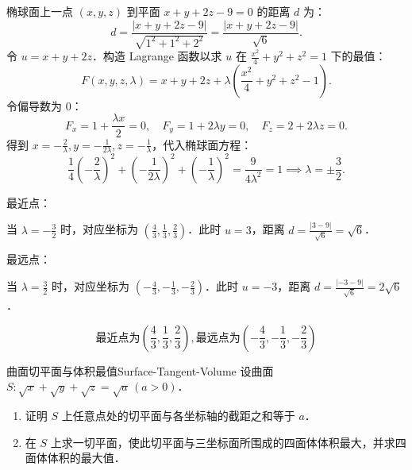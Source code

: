 \begin{solution}
    椭球面上一点 $(x, y, z)$ 到平面 $x + y + 2z - 9 = 0$ 的距离 $d$ 为：
    \begin{equation}
        d = \frac{|x + y + 2z - 9|}{\sqrt{1^2 + 1^2 + 2^2}} = \frac{|x + y + 2z - 9|}{\sqrt{6}}.
    \end{equation}
    令 $u = x + y + 2z$．构造 Lagrange 函数以求 $u$ 在 $\frac{x^2}{4} + y^2 + z^2 = 1$ 下的最值：
    \begin{equation}
        F(x, y, z, \lambda) = x + y + 2z + \lambda \left( \frac{x^2}{4} + y^2 + z^2 - 1 \right).
    \end{equation}
    令偏导数为 $0$：
    \begin{equation}
        F_x = 1 + \frac{\lambda x}{2} = 0, \quad F_y = 1 + 2\lambda y = 0, \quad F_z = 2 + 2\lambda z = 0.
    \end{equation}
    得到 $x = -\frac{2}{\lambda}, y = -\frac{1}{2\lambda}, z = -\frac{1}{\lambda}$，代入椭球面方程：
    \begin{equation}
        \frac{1}{4} \left( -\frac{2}{\lambda} \right)^2 + \left( -\frac{1}{2\lambda} \right)^2 + \left( -\frac{1}{\lambda} \right)^2 = \frac{9}{4\lambda^2} = 1 \implies \lambda = \pm \frac{3}{2}.
    \end{equation}

     最近点：

    当 $\lambda = -\frac{3}{2}$ 时，对应坐标为 $\left( \frac{4}{3}, \frac{1}{3}, \frac{2}{3} \right)$．此时 $u = 3$，距离 $d = \frac{|3-9|}{\sqrt{6}} = \sqrt{6}$．

     最远点：

    当 $\lambda = \frac{3}{2}$ 时，对应坐标为 $\left( -\frac{4}{3}, -\frac{1}{3}, -\frac{2}{3} \right)$．此时 $u = -3$，距离 $d = \frac{|-3-9|}{\sqrt{6}} = 2\sqrt{6}$．

    \begin{equation}
        \boxed{\text{最近点为} \left( \frac{4}{3}, \frac{1}{3}, \frac{2}{3} \right), \text{最远点为} \left( -\frac{4}{3}, -\frac{1}{3}, -\frac{2}{3} \right)}
    \end{equation}
\end{solution}


\begin{problem}{曲面切平面与体积最值}{Surface-Tangent-Volume}
    设曲面 $S: \sqrt{x} + \sqrt{y} + \sqrt{z} = \sqrt{a} \, (a > 0)$．
    \begin{enumerate}
        \item 证明 $S$ 上任意点处的切平面与各坐标轴的截距之和等于 $a$．
        \item 在 $S$ 上求一切平面，使此切平面与三坐标面所围成的四面体体积最大，并求四面体体积的最大值．
    \end{enumerate}
\end{problem}

